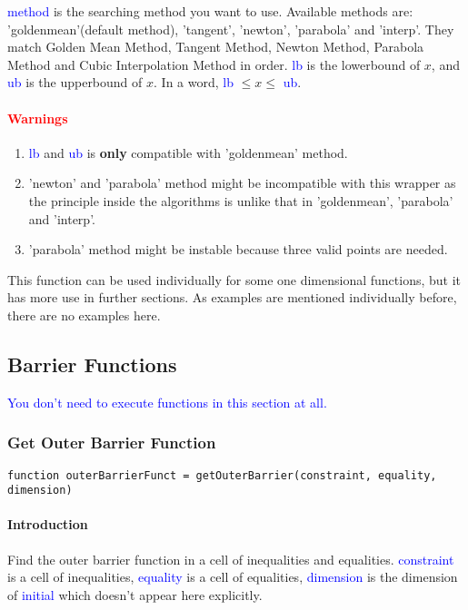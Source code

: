 \documentclass{article}
\begin{document}
\textcolor{blue}{method} is the searching method you want to use. Available methods are: 'goldenmean'(default method), 'tangent', 'newton', 'parabola' and 'interp'. They match Golden Mean Method, Tangent Method, Newton Method, Parabola Method and Cubic Interpolation Method in order. \textcolor{blue}{lb} is the lowerbound of $x$, and \textcolor{blue}{ub} is the upperbound of $x$. In a word, \textcolor{blue}{lb} $\leqslant x \leqslant$ \textcolor{blue}{ub}.

\paragraph{\textcolor{red}{Warnings}}
\begin{enumerate}
    \item \textcolor{blue}{lb} and \textcolor{blue}{ub} is \textbf{only} compatible with 'goldenmean' method.
    \item 'newton' and 'parabola' method might be incompatible with this wrapper as the principle inside the algorithms is unlike that in 'goldenmean', 'parabola' and 'interp'.
    \item 'parabola' method might be instable because three valid points are needed.
\end{enumerate}

This function can be used individually for some one dimensional functions, but it has more use in further sections. As examples are mentioned individually before, there are no examples here.

\subsection{Barrier Functions}
\textcolor{blue}{You don't need to execute functions in this section at all.}

\subsubsection{Get Outer Barrier Function}
\begin{verbatim}
function outerBarrierFunct = getOuterBarrier(constraint, equality, dimension)
\end{verbatim}
\paragraph{Introduction}
Find the outer barrier function in a cell of inequalities and equalities. \textcolor{blue}{constraint} is a cell of inequalities, \textcolor{blue}{equality} is a cell of equalities, \textcolor{blue}{dimension} is the dimension of \textcolor{blue}{initial} which doesn't appear here explicitly.
\end{document}
